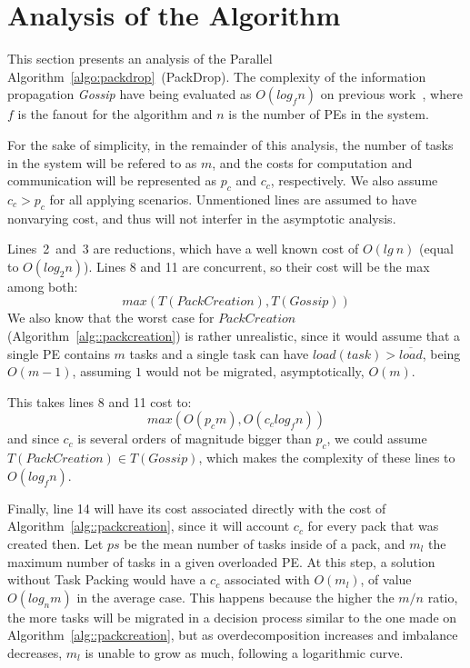\section{Analysis of the Algorithm}

This section presents an analysis of the Parallel Algorithm~\ref{algo:packdrop}~(PackDrop). 
The complexity of the information propagation \textit{Gossip} have being evaluated as $O(log_fn)$ on previous work~\cite{grapevine},
where $f$ is the fanout for the algorithm and $n$ is the number of PEs in the system.

For the sake of simplicity, in the remainder of this analysis, the number of tasks in the system
will be refered to as $m$, and the costs for computation and communication will be represented as $p_c$ and $c_c$, respectively.
We also assume $c_c > p_c$ for all applying scenarios.
Unmentioned lines are assumed to have nonvarying cost, and thus will not interfer in the asymptotic analysis.

Lines~2~and~3 are reductions, which have a well known cost of $O(lg\ n)$ (equal to $O(log_2n)$).
Lines 8 and 11 are concurrent, so their cost will be the max among both:
\begin{equation*}
  max(T(PackCreation),T(Gossip))
\end{equation*}
We also know that the worst case for $PackCreation$ (Algorithm~\ref{alg::packcreation}) is rather unrealistic, 
since it would assume that a single PE contains $m$ tasks and a single task can have $load(task) > \overline{load}$, being $O(m-1)$, assuming $1$ would not be migrated, asymptotically, $O(m)$.


This takes lines 8 and 11 cost to:
\begin{equation*}
 max(O(p_cm),O(c_clog_fn))
\end{equation*}
and since $c_c$ is several orders of magnitude bigger than $p_c$, we could assume $T(PackCreation)\in T(Gossip)$, which makes the 
complexity of these lines to $O(log_fn)$.

Finally, line 14 will have its cost associated directly with the cost of Algorithm~\ref{alg::packcreation}, since it will account $c_c$ for every pack that was created then.
Let $ps$ be the mean number of tasks inside of a pack, and $m_l$ the maximum number of tasks in a given overloaded PE.
At this step, a solution without Task Packing would have a $c_c$ associated with $O(m_l)$, of value $O(log_nm)$ in the average case.
This happens because the higher the $m/n$ ratio, the more tasks will be migrated in a decision process similar to the one made on Algorithm~\ref{alg::packcreation}, but as overdecomposition increases and imbalance decreases, $m_l$ is unable to grow as much, following a logarithmic curve. 

